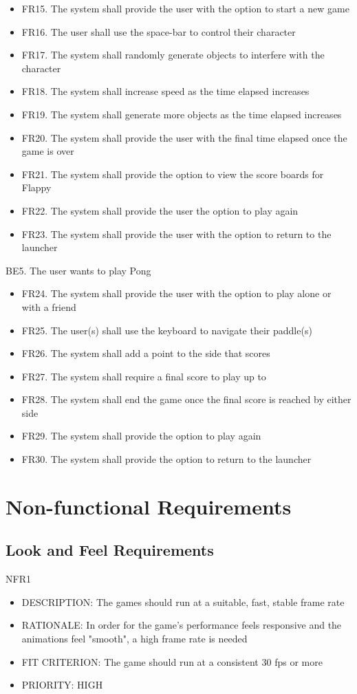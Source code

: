 \documentclass[12pt, titlepage]{article}
\begin{document}
    \begin{itemize}
        \item FR15. The system shall provide the user with the option to start a new game
        \item FR16. The user shall use the space-bar to control their character
        \item FR17. The system shall randomly generate objects to interfere with the character
        \item FR18. The system shall increase speed as the time elapsed increases
        \item FR19. The system shall generate more objects as the time elapsed increases
        \item FR20. The system shall provide the user with the final time elapsed once the game is over
        \item FR21. The system shall provide the option to view the score boards for Flappy
        \item FR22. The system shall provide the user the option to play again
        \item FR23. The system shall provide the user with the option to return to the launcher
    \end{itemize}
    BE5. The user wants to play Pong
    \begin{itemize}
        \item FR24. The system shall provide the user with the option to play alone or with a friend
        \item FR25. The user(s) shall use the keyboard to navigate their paddle(s)
        \item FR26. The system shall add a point to the side that scores
        \item FR27. The system shall require a final score to play up to
        \item FR28. The system shall end the game once the final score is reached by either side
        \item FR29. The system shall provide the option to play again
        \item FR30. The system shall provide the option to return to the launcher
    \end{itemize}


\section{Non-functional Requirements}
\subsection{Look and Feel Requirements}
NFR1
\begin{itemize}
    \item DESCRIPTION: The games should run at a suitable, fast, stable frame rate 
    \item RATIONALE: In order for the game's performance feels responsive and the animations feel "smooth", a high frame rate is needed
    \item FIT CRITERION: The game should run at a consistent 30 fps or more
    \item PRIORITY: HIGH
\end{itemize}
\end{document}
